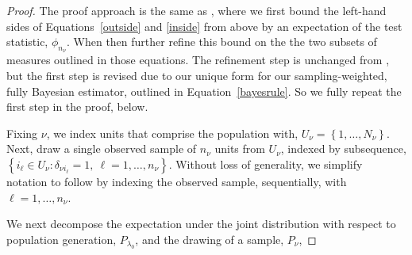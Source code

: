 \documentclass[]{imsart}
\begin{document}
\begin{proof}\label{AppNumerator}
The proof approach is the same as \citet{savitsky2016bayesian}, where we first bound the left-hand sides of Equations~\eqref{outside} and \eqref{inside} from above by an expectation of the test statistic, $\phi_{n_{\nu}}$.  When then further refine this bound on the the two subsets of measures outlined in those equations.   The refinement step is unchanged from \citet{savitsky2016bayesian}, but the first step is revised due to our unique form for our sampling-weighted, fully Bayesian estimator, outlined in Equation~\eqref{bayesrule}.  So we fully repeat the first step in the proof, below.

Fixing $\nu$, we index units that comprise the population with, $U_{\nu} = \left\{1,\ldots,N_{\nu}\right\}$.  Next, draw a single observed sample of $n_{\nu}$ units from $U_{\nu}$, indexed by subsequence, \newline$\left\{i_{\ell} \in U_{\nu}: \delta_{\nu i_{\ell}} = 1,~\ell = 1,\ldots,n_{\nu}\right\}$.  Without loss of generality, we simplify notation to follow by indexing the observed sample, sequentially, with $\ell = 1,\ldots,n_{\nu}$.

We next decompose the expectation under the joint distribution with respect to population generation, $P_{\lambda_{0}}$, and the drawing of a sample, $P_{\nu}$,


\end{proof}
\end{document}
